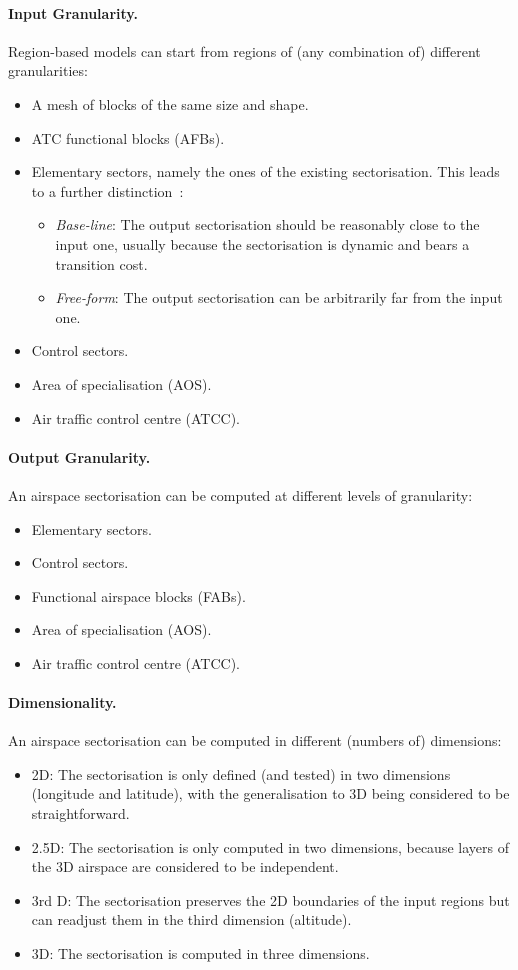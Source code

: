 \documentclass[a4paper,12pt]{article}
\begin{document}
\paragraph{Input Granularity.}
Region-based models can start from regions of (any combination of)
different granularities:
\begin{itemize}
\item A mesh of blocks of the same size and shape.
\item ATC functional blocks (AFBs).
\item Elementary sectors, namely the ones of the existing
  sectorisation.  This leads to a further
  distinction~\cite{Zelinski:DASC11}:
  \begin{itemize}
  \item \emph{Base-line}: The output sectorisation should be
    reasonably close to the input one, usually because the
    sectorisation is dynamic and bears a transition cost.
  \item \emph{Free-form}: The output sectorisation can be arbitrarily
    far from the input one.
  \end{itemize}
\item Control sectors.
\item Area of specialisation (AOS).
\item Air traffic control centre (ATCC).
\end{itemize}

\paragraph{Output Granularity.}  
An airspace sectorisation can be computed at different levels of
granularity:
\begin{itemize}
\item Elementary sectors.
\item Control sectors.
\item Functional airspace blocks (FABs).
\item Area of specialisation (AOS).
\item Air traffic control centre (ATCC).
\end{itemize}

\paragraph{Dimensionality.}
An airspace sectorisation can be computed in different (numbers of)
dimensions:
\begin{itemize}
\item 2D: The sectorisation is only defined (and tested) in two
  dimensions (longitude and latitude), with the generalisation to 3D
  being considered to be straightforward.
\item 2.5D: The sectorisation is only computed in two dimensions,
  because layers of the 3D airspace are considered to be independent.
\item 3rd D: The sectorisation preserves the 2D boundaries of the
  input regions but can readjust them in the third dimension
  (altitude).
\item 3D: The sectorisation is computed in three dimensions.
\end{itemize}
\end{document}
